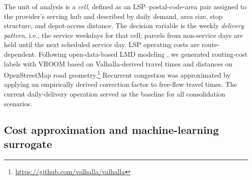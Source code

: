 \documentclass[3p,times,procedia]{elsarticle}
\begin{document}
The unit of analysis is a \emph{cell}, defined as an LSP--postal-code-area pair assigned to the provider's serving hub and described by daily demand, area size, stop structure, and depot-access distance. The decision variable is the weekly \emph{delivery pattern}, i.e., the service weekdays for that cell; parcels from non-service days are held until the next scheduled service day. LSP operating costs are route-dependent. Following open-data-based LMD modeling \citep{HORL2025104893}, we generated routing-cost labels with VROOM \citep{vroom_v1.14} based on Valhalla-derived travel times and distances on OpenStreetMap road geometry.\footnote{\url{https://github.com/valhalla/valhalla}} Recurrent congestion was approximated by applying an empirically derived correction factor to free-flow travel times. The current daily-delivery operation served as the baseline for all consolidation scenarios.







\subsection{Cost approximation and machine-learning surrogate}
\label{sec:cost_model}
\end{document}
